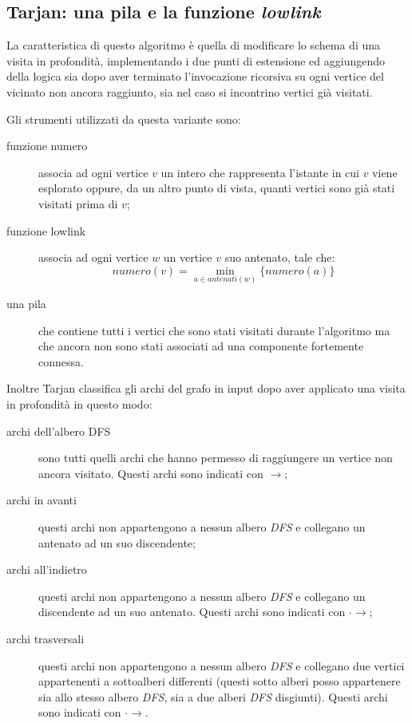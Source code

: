 \subsection{Tarjan: una pila e la funzione \emph{lowlink}}
\label{subsection:tarjan-algorithm}
La caratteristica di questo algoritmo \`e quella di modificare lo
schema di una visita in profondit\`a, implementando i due punti di
estensione ed aggiungendo della logica sia dopo aver terminato
l'invocazione ricorsiva su ogni vertice del vicinato non ancora
raggiunto, sia nel caso si incontrino vertici gi\`a visitati.

Gli strumenti utilizzati da questa variante sono:
\begin{description}
\item[funzione numero] associa ad ogni vertice $v$ un intero che
  rappresenta l'istante in cui $v$ viene esplorato oppure, da un altro
  punto di vista, quanti vertici sono gi\`a stati visitati prima di
  $v$;
\item[funzione lowlink] associa ad ogni vertice $w$ un vertice $v$ suo
  antenato, tale che:
  \begin{displaymath}
    numero(v) = \min_{a \in antenati(w)}\{numero(a)\}
\end{displaymath}
\item[una pila] che contiene tutti i vertici che sono stati visitati
  durante l'algoritmo ma che ancora non sono stati associati ad una
  componente fortemente connessa.
\end{description}

Inoltre Tarjan classifica gli archi del grafo in input dopo aver
applicato una visita in profondit\`a in questo modo:
\begin{description}
\item[archi dell'albero DFS] sono tutti quelli archi che hanno
  permesso di raggiungere un vertice non ancora visitato. Questi archi
  sono indicati con $\rightarrow$;
\item[archi in avanti] questi archi non appartengono a nessun albero
  \emph{DFS} e collegano un antenato ad un suo discendente;
\item[archi all'indietro] questi archi non appartengono a nessun
  albero \emph{DFS} e collegano un discendente ad un suo
  antenato. Questi archi sono indicati con $\cdot\rightarrow$;
\item[archi trasversali] questi archi non appartengono a nessun albero
  \emph{DFS} e collegano due vertici appartenenti a sottoalberi
  differenti (questi sotto alberi posso appartenere sia allo stesso
  albero \emph{DFS}, sia a due alberi \emph{DFS} disgiunti). Questi
  archi sono indicati con $\cdot\rightarrow$.
\end{description}

